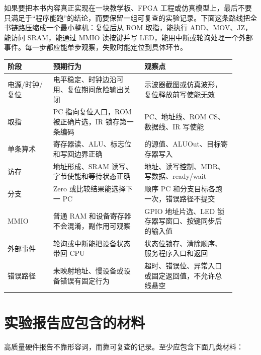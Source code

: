 如果要把本书内容真正实现在一块教学板、FPGA 工程或仿真模型上，最后不要只满足于“程序能跑”的结论，而要保留一组可复查的实验记录。下面这条路线把全书链路压缩成一个最小整机：复位后从 ROM 取指，能执行 ADD、MOV、JZ，能访问 SRAM，能通过 MMIO 读按键并写 LED，能用中断或轮询处理一个外部事件。每一步都应能单步观察，失败时能定位到具体环节。

\begin{longtable}{L{0.18\linewidth}L{0.36\linewidth}L{0.36\linewidth}}
\toprule
阶段 & 预期行为 & 观察点 \\
\midrule
电源/时钟/复位 & 电平稳定、时钟边沿可用、复位期间危险输出关闭 & 示波器截图或仿真波形，复位释放前写使能无效 \\\tablerowrule
取指 & PC 指向复位入口，ROM 被正确片选，IR 锁存第一条编码 & PC、地址线、ROM CS、数据线、IR 写使能 \\\tablerowrule
单条算术 & 寄存器读、ALU、标志位和写回边界正确 &  的源值、ALUOut、目标寄存器写入 \\\tablerowrule
访存 & 地址形成、SRAM 读写、字节使能和等待状态正确 & 地址、读写控制、MDR、写数据、ready/wait \\\tablerowrule
分支 & Zero 或比较结果能选择下一 PC & 顺序 PC 和分支目标各跑一次，错误路径不提交 \\\tablerowrule
MMIO & 普通 RAM 和设备寄存器不会混淆，副作用可观察 & GPIO 地址片选、LED 锁存器写窗口、按键同步后的输入值 \\\tablerowrule
外部事件 & 轮询或中断能把设备状态带回 CPU & 状态位锁存、清除顺序、服务程序入口和返回 \\\tablerowrule
错误路径 & 未映射地址、慢设备或设备错误有固定行为 & 超时、错误位、异常入口或固定返回值，不允许总线悬空 \\
\bottomrule
\end{longtable}

\section*{实验报告应包含的材料}

高质量硬件报告不靠形容词，而靠可复查的记录。至少应包含下面几类材料：

